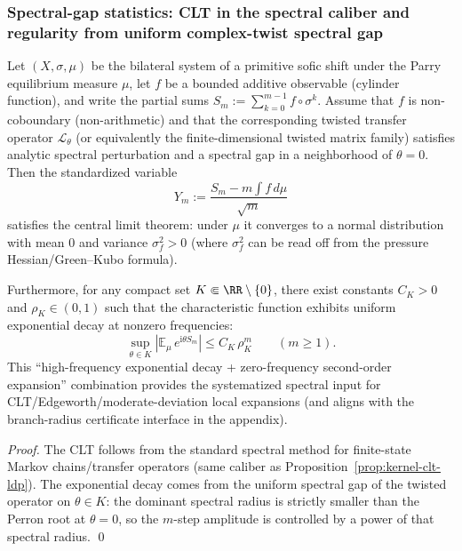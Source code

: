 \subsubsection{Spectral-gap statistics: CLT in the spectral caliber and regularity from uniform complex-twist spectral gap}

\begin{theorem}\label{thm:conclusion63-clt-spectral}
Let \((X,\sigma,\mu)\) be the bilateral system of a primitive sofic shift under the Parry equilibrium measure \(\mu\), let \(f\) be a bounded additive observable (cylinder function), and write the partial sums
\(
S_m:=\sum_{k=0}^{m-1}f\circ\sigma^{k}
\).
Assume that \(f\) is non-coboundary (non-arithmetic) and that the corresponding twisted transfer operator \(\mathcal{L}_{\theta}\) (or equivalently the finite-dimensional twisted matrix family) satisfies analytic spectral perturbation and a spectral gap in a neighborhood of \(\theta=0\).
Then the standardized variable
\[
Y_m:=\frac{S_m-m\int f\,d\mu}{\sqrt{m}}
\]
satisfies the central limit theorem: under \(\mu\) it converges to a normal distribution with mean \(0\) and variance \(\sigma_f^2>0\) (where \(\sigma_f^2\) can be read off from the pressure Hessian/Green--Kubo formula).
\par
Furthermore, for any compact set \(K\Subset \RR\setminus\{0\}\), there exist constants \(C_K>0\) and \(\rho_K\in(0,1)\) such that the characteristic function exhibits uniform exponential decay at nonzero frequencies:
\[
\boxed{\;
\sup_{\theta\in K}\left|\mathbb{E}_{\mu}\,e^{\mathrm{i}\theta S_m}\right|
\le C_K\,\rho_K^{m}\qquad(m\ge 1).\;}
\]
This ``high-frequency exponential decay + zero-frequency second-order expansion'' combination provides the systematized spectral input for CLT/Edgeworth/moderate-deviation local expansions (and aligns with the branch-radius certificate interface in the appendix).
\end{theorem}

\begin{proof}
The CLT follows from the standard spectral method for finite-state Markov chains/transfer operators (same caliber as Proposition~\ref{prop:kernel-clt-ldp}).
The exponential decay comes from the uniform spectral gap of the twisted operator on \(\theta\in K\): the dominant spectral radius is strictly smaller than the Perron root at \(\theta=0\), so the \(m\)-step amplitude is controlled by a power of that spectral radius. \qed
\end{proof}

